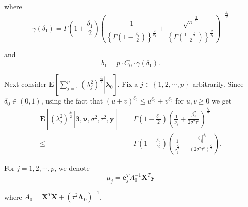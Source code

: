 \documentclass[noinfoline,11pt]{imsart}
\numberwithin{equation}{section}
\theoremstyle{plain}
\newcommand{\y}{\mathbf{y}}
\newcommand{\X}{\mathbf{X}}
\newcommand{\bl}{\boldsymbol{\lambda}}
\newcommand{\Bl}{\boldsymbol{\Lambda}}
\newcommand{\E}{\boldsymbol{E}}
\begin{document}
\noindent
where 
$$
\gamma\left(\delta_1\right)=\Gamma\left(1+\frac{\delta_1}{2}\right)\left(\frac{1}{\left\{\Gamma\left(1-\frac{\delta_1}{2}\right)\right\}^{\frac{2}{\delta_1}}}+\frac{\sqrt{\pi}^{\frac{2}{\delta_1}}}{\left\{\Gamma\left(\frac{1-\delta_1}{2}\right)\right\}^{\frac{2}{\delta_1}}}\right)^{-\frac{\delta_1}{2}} 
$$ 

\noindent
and 
$$
b_1=p\cdot C_0\cdot\gamma\left(\delta_1\right). 
$$

\noindent
Next consider $\E\left[\left.\sum\limits_{j=1}^p\left(\lambda_j^2\right)^{\frac{\delta_0}{2}}\right|\mathbf{\bl}_0\right]$. 
Fix a $j\in\left\{1,2,\cdots,p\right\}$ arbitrarily. Since $\delta_0 \in (0,1)$, using the fact that $(u+v)^{\delta_0}\leq u^{\delta_0}+v^{\delta_0}$ for $u,v\geq 0$ we get \begin{align*}
    \E\left[\left.\left(\lambda_j^2\right)^{\frac{\delta_0}{2}}\right|\boldsymbol{\beta,\nu},\sigma^2,\tau^2,\mathbf{y}\right] = {} & \Gamma\left(1-\frac{\delta_0}{2}\right)\left(\frac{1}{\nu_j}+\frac{\beta_j^2}{2\sigma^2\tau^2}\right)^{\frac{\delta_0}{2}} \\
     \leq {} & \Gamma\left(1-\frac{\delta_0}{2}\right)\left(\frac{1}{\nu_j^{\frac{\delta_0}{2}}}+\frac{\left|\beta_j\right|^{\delta_0}}{\left(2\sigma^2\tau^2\right)^{\frac{\delta_0}{2}}}\right). 
\end{align*}

\noindent

For  $j=1,2,\cdots,p$, we denote 
\begin{equation} \label{conditional_mean_definition}
\mu_j = \boldsymbol{e}_j^TA_0^{-1}\X^T\y 
\end{equation}

\noindent

where $A_0 = \X^T\X + (\tau^2 \Bl_0)^{-1}$. 
\end{document}
